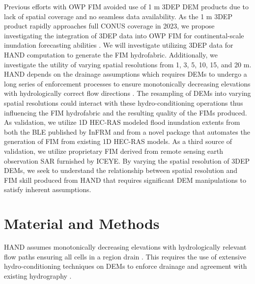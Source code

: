 \documentclass[preprint,review,12pt]{dependencies/elsarticle}
\begin{document}
Previous efforts with \ac{OWP} \ac{FIM} avoided use of 1 \ac{m} \ac{3DEP} \ac{DEM} products due to lack of spatial coverage and no seamless data availability.
As the 1 \ac{m} \ac{3DEP} product rapidly approaches full \ac{CONUS} coverage in 2023, we propose investigating the integration of \ac{3DEP} data into \ac{OWP} \ac{FIM} for continental-scale inundation forecasting abilities \citep{usgs2022status,usgs2022partnerships}.
We will investigate utilizing \ac{3DEP} data for \ac{HAND} computation to generate the \ac{FIM} hydrofabric.
Additionally, we investigate the utility of varying spatial resolutions from 1, 3, 5, 10, 15, and 20 \ac{m}.
\ac{HAND} depends on the drainage assumptions which requires \acp{DEM} to undergo a long series of enforcement processes to ensure monotonically decreasing elevations with hydrologically correct flow directions \citep{garousi2019terrain,nobre2011height,nobre2016hand,aristizabal2022extending}.
The resampling of \acp{DEM} into varying spatial resolutions could interact with these \ac{hydro-conditioning} operations thus influencing the \ac{FIM} hydrofabric and the resulting quality of the \acp{FIM} produced.
As validation, we utilize \ac{1D} \ac{HEC-RAS} modeled flood inundation extents from both the \ac{BLE} published by \ac{InFRM} and from a novel package that automates the generation of \ac{FIM} from existing \ac{1D} \ac{HEC-RAS} models.
As a third source of validation, we utilize proprietary \ac{FIM} derived from remote sensing earth observation \ac{SAR} furnished by ICEYE.
By varying the spatial resolution of \ac{3DEP} \acp{DEM}, we seek to understand the relationship between spatial resolution and \ac{FIM} skill produced from \ac{HAND} that requires significant \ac{DEM} manipulations to satisfy inherent assumptions. 


\section{Material and Methods}
\label{sec:material_and_matheds}
%
\ac{HAND} assumes monotonically decreasing elevations with hydrologically relevant flow paths ensuring all cells in a region drain \citep{renno2008hand,nobre2011height,nobre2016hand}.
This requires the use of extensive \ac{hydro-conditioning} techniques on \acp{DEM} to enforce drainage and agreement with existing hydrography \citep{aristizabal2022extending,maidment2017conceptual,liu2016cybergis,liu2020height}.
\end{document}
